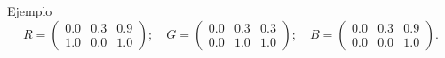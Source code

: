 \begin{frame}{Ejemplo}
    \[
        R = \begin{pmatrix}
            0.0& 0.3& 0.9\\
            1.0& 0.0& 1.0
        \end{pmatrix};\quad
        G = \begin{pmatrix}
            0.0& 0.3& 0.3\\
            0.0& 1.0& 1.0
        \end{pmatrix};\quad
        B = \begin{pmatrix}
            0.0& 0.3& 0.9\\
            0.0& 0.0& 1.0
        \end{pmatrix}.
    \]
    \pause  
    \begin{center}
    \end{center}
\end{frame}

